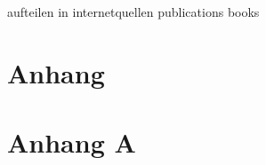 \documentclass[12pt,oneside]{article}
\begin{document}
\printbibliography
{}
aufteilen in internetquellen
publications
books

\newpage
{}
\section{Anhang}
\appendix
\section{Anhang A} 





\clearpage

\end{document}
